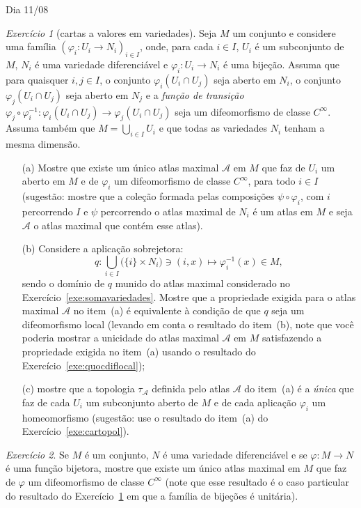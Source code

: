 \documentclass[oneside,11pt]{amsart}
\theoremstyle{remark}\newtheorem{exercise}{Exercício}[section]
\theoremstyle{plain}\newtheorem{teo}{Teorema}[section]
\theoremstyle{plain}\newtheorem{lem}[teo]{Lema}
\theoremstyle{plain}\newtheorem{prop}[teo]{Proposição}
\theoremstyle{definition}\newtheorem{defin}[teo]{Definição}
\theoremstyle{remark}\newtheorem{rem}[teo]{Observação}
\theoremstyle{definition}\newtheorem{example}[teo]{Exemplo}
\numberwithin{equation}{section}
\begin{document}
\begin{section}{Dia 11/08}
\begin{exercise}[cartas a valores em variedades]\label{exe:manifoldcharts}
Seja $M$ um conjunto e considere uma família $(\varphi_i:U_i\to N_i)_{i\in I}$, onde, para cada $i\in I$, $U_i$ é um subconjunto de $M$,
$N_i$ é uma variedade diferenciável e $\varphi_i:U_i\to N_i$ é uma bijeção. Assuma que para quaisquer $i,j\in I$, o conjunto $\varphi_i(U_i\cap U_j)$
seja aberto em $N_i$, o conjunto $\varphi_j(U_i\cap U_j)$ seja aberto em $N_j$ e a {\em função de transição\/}
$\varphi_j\circ\varphi_i^{-1}:\varphi_i(U_i\cap U_j)\to\varphi_j(U_i\cap U_j)$ seja um difeomorfismo de classe $C^\infty$. Assuma também
que $M=\bigcup_{i\in I}U_i$ e que todas as variedades $N_i$ tenham a mesma dimensão.
\begin{itemize}
\item[(a)] Mostre que existe um único atlas maximal $\mathcal A$ em $M$ que faz de $U_i$ um aberto em $M$ e de $\varphi_i$ um difeomorfismo de classe $C^\infty$,
para todo $i\in I$ (sugestão: mostre que a coleção formada pelas composições $\psi\circ\varphi_i$, com $i$ percorrendo $I$ e $\psi$ percorrendo o atlas maximal
de $N_i$ é um atlas em $M$ e seja $\mathcal A$ o atlas maximal que contém esse atlas).
\item[(b)] Considere a aplicação sobrejetora:
\[q:\bigcup_{i\in I}\big(\{i\}\times N_i\big)\ni(i,x)\longmapsto\varphi_i^{-1}(x)\in M,\]
sendo o domínio de $q$ munido do atlas maximal considerado no Exercício~\ref{exe:somavariedades}. Mostre que a propriedade exigida para o atlas maximal
$\mathcal A$ no item~(a) é equivalente à condição de que $q$ seja um difeomorfismo local (levando em conta o resultado do item~(b), note que você poderia
mostrar a unicidade do atlas maximal $\mathcal A$ em $M$ satisfazendo a propriedade exigida no item~(a) usando o resultado do Exercício~\ref{exe:quocdiflocal});
\item[(c)] mostre que a topologia $\tau_{\mathcal A}$ definida pelo atlas $\mathcal A$ do item~(a) é a {\em única\/} que faz de cada $U_i$ um subconjunto aberto de $M$
e de cada aplicação $\varphi_i$ um homeomorfismo (sugestão: use o resultado do item~(a) do Exercício~\ref{exe:cartopol}).
\end{itemize}

\end{exercise}

\begin{exercise}\label{exe:empurraatlas}
Se $M$ é um conjunto, $N$ é uma variedade diferenciável e se $\varphi:M\to N$ é uma função bijetora, mostre que existe
um único atlas maximal em $M$ que faz de $\varphi$ um difeomorfismo de classe $C^\infty$ (note que esse resultado
é o caso particular do resultado do Exercício~\ref{exe:manifoldcharts} em que a família de bijeções é unitária).
\end{exercise}


\end{section}
\end{document}
